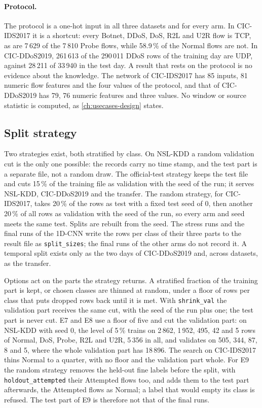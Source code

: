 \paragraph{Protocol.}
The protocol is a one-hot input in all three datasets and for every arm. In CIC-IDS2017 it is a
shortcut: every Botnet, DDoS, DoS, R2L and U2R flow is TCP, as are 7\,629 of the 7\,810 Probe
flows, while 58.9\,\% of the Normal flows are not. In CIC-DDoS2019, 261\,613 of the 290\,011 DDoS
rows of the training day are UDP, against 28\,211 of 33\,940 in the test day. A result that rests
on the protocol is no evidence about the knowledge. The network of CIC-IDS2017 has 85 inputs, 81
numeric flow features and the four values of the protocol, and that of CIC-DDoS2019 has 79, 76
numeric features and three values. No window or source statistic is
computed, as \cref{ch:usecases-design} states.

\subsection{Split strategy}
\label{sec:impl-splits}

Two strategies exist, both stratified by class. On NSL-KDD a random validation cut is the only one possible: the
records carry no time stamp, and the test part is a separate file, not a random draw. The official-test strategy keeps the test
file and cuts 15\,\% of the training file as validation with the seed of the run; it serves
NSL-KDD, CIC-DDoS2019 and the transfer. The random strategy, for CIC-IDS2017, takes 20\,\% of the
rows as test with a fixed test seed of 0, then another 20\,\% of all rows as validation with the seed of the run, so
every arm and seed meets the same test. Splits are rebuilt from the seed. The stress runs and the final runs of
the 1D-CNN write the rows per class of their three parts to the result file as
\texttt{split\_sizes}; the final runs of the other arms do not record it. A temporal split exists only as the two days of CIC-DDoS2019 and, across datasets, as
the transfer.

Options act on the parts the strategy returns. A stratified fraction of the training part is
kept, or chosen classes are thinned at random, under a floor of rows per class that puts dropped
rows back until it is met. With \texttt{shrink\_val} the validation part receives the same cut,
with the seed of the run plus one; the test part is never cut. E7 and E8 use a floor of five and
cut the validation part: on NSL-KDD with seed 0, the level of 5\,\% trains on 2\,862, 1\,952,
495, 42 and 5 rows of Normal, DoS, Probe, R2L and U2R, 5\,356 in all, and validates on 505, 344,
87, 8 and 5, where the whole validation part has 18\,896. The search on CIC-IDS2017 thins Normal to
a quarter, with no floor and the validation part whole. For E9 the random strategy removes the
held-out fine labels before the split, with \texttt{holdout\_attempted} their Attempted flows too,
and adds them to the test part afterwards, the Attempted flows as Normal; a label that would empty
its class is refused. The test part of E9 is therefore not that of the final runs.

